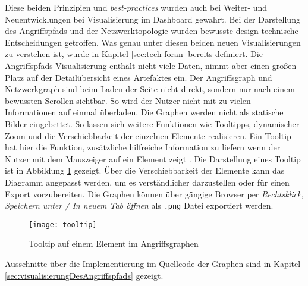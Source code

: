 \par Diese beiden Prinzipien und \textit{best-practices} wurden auch bei Weiter- und Neuentwicklungen bei Visualisierung im Dashboard gewahrt. Bei der Darstellung des Angriffspfads und der Netzwerktopologie wurden bewusste design-technische Entscheidungen getroffen. Was genau unter diesen beiden neuen Visualisierungen zu verstehen ist, wurde in Kapitel \ref{sec:tech-foran}  bereits definiert. Die Angriffspfads-Visualisierung enthält nicht viele Daten, nimmt aber einen großen Platz auf der Detailübersicht eines Artefaktes ein. Der Angriffsgraph und Netzwerkgraph sind beim Laden der Seite nicht direkt, sondern nur nach einem bewussten Scrollen sichtbar. So wird der Nutzer nicht mit zu vielen Informationen auf einmal überladen. Die Graphen werden nicht als statische Bilder eingebettet. So lassen sich weitere Funktionen wie Tooltipps, dynamischer Zoom und die Verschiebbarkeit der einzelnen Elemente realisieren. Ein Tooltip hat hier die Funktion, zusätzliche hilfreiche Information zu liefern wenn der Nutzer mit dem Mauszeiger auf ein Element zeigt \autocite{TooltipCarbonDesign}. Die Darstellung eines Tooltip ist in Abbildung \ref{fig:tooltip} gezeigt. Über die Verschiebbarkeit der Elemente kann das Diagramm angepasst werden, um es verständlicher darzustellen oder für einen Export vorzubereiten. Die Graphen können über gängige Browser per \textit{Rechtsklick, Speichern unter / In neuem Tab öffnen} als \verb|.png| Datei exportiert werden.
%
\begin{figure}[H]
    \centering
    \texttt{[image: tooltip]}
    \caption{Tooltip auf einem Element im Angriffsgraphen}
    \label{fig:tooltip}
\end{figure}
%
\par Ausschnitte über die Implementierung im Quellcode der Graphen sind in Kapitel \ref{sec:visualisierungDesAngriffspfads} gezeigt.

